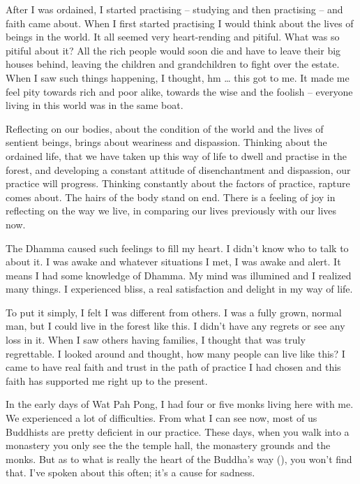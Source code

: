 After I was ordained, I started practising -- studying and then practising -- and faith came about. When I first started practising I would think about the lives of beings in the world. It all seemed very heart-rending and pitiful. What was so pitiful about it? All the rich people would soon die and have to leave their big houses behind, leaving the children and grandchildren to fight over the estate. When I saw such things happening, I thought, hm \ldots{} this got to me. It made me feel pity towards rich and poor alike, towards the wise and the foolish -- everyone living in this world was in the same boat.

Reflecting on our bodies, about the condition of the world and the lives of sentient beings, brings about weariness and dispassion. Thinking about the ordained life, that we have taken up this way of life to dwell and practise in the forest, and developing a constant attitude of disenchantment and dispassion, our practice will progress. Thinking constantly about the factors of practice, rapture comes about. The hairs of the body stand on end. There is a feeling of joy in reflecting on the way we live, in comparing our lives previously with our lives now.

The Dhamma caused such feelings to fill my heart. I didn't know who to talk to about it. I was awake and whatever situations I met, I was awake and alert. It means I had some knowledge of Dhamma. My mind was illumined and I realized many things. I experienced bliss, a real satisfaction and delight in my way of life.

To put it simply, I felt I was different from others. I was a fully grown, normal man, but I could live in the forest like this. I didn't have any regrets or see any loss in it. When I saw others having families, I thought that was truly regrettable. I looked around and thought, how many people can live like this? I came to have real faith and trust in the path of practice I had chosen and this faith has supported me right up to the present.

In the early days of Wat Pah Pong, I had four or five monks living here with me. We experienced a lot of difficulties. From what I can see now, most of us Buddhists are pretty deficient in our practice. These days, when you walk into a monastery you only see the  the temple hall, the monastery grounds and the monks. But as to what is really the heart of the Buddha's way (), you won't find that. I've spoken about this often; it's a cause for sadness.

